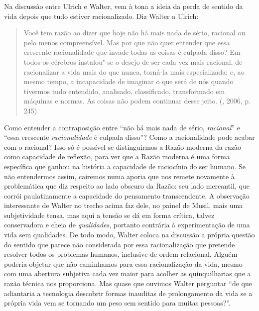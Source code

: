 {Na discussão entre Ulrich e Walter, vem à tona a ideia da perda de
sentido da vida depois que tudo estiver racionalizado. Diz Walter a
Ulrich:

\begin{quote}
Você tem razão ao dizer que hoje não há mais nada de sério, racional ou
pelo menos compreensível. Mas por que não quer entender que essa
crescente racionalidade que invade todas as coisas é culpada disso? Em
todos os cérebros instalou"-se o desejo de ser cada vez mais racional, de
racionalizar a vida mais do que nunca, torná-la mais especializada; e,
ao mesmo tempo, a incapacidade de imaginar o que será de nós quando
tivermos tudo entendido, analisado, classificado, transformado em
máquinas e normas. As coisas não podem continuar desse jeito. (,
2006, p. 245)
\end{quote}

Como entender a contraposição entre ``não há mais nada de sério,
\emph{racional}'' e ``essa crescente \emph{racionalidade} é culpada
disso''? Como a racionalidade pode acabar com o racional? Isso só é
possível se distinguirmos a Razão moderna da razão como capacidade de
reflexão, para ver que a Razão moderna é uma forma específica que ganhou
na história a capacidade de raciocínio do ser humano. Se não entendermos
assim, cairemos numa aporia que nos remete novamente à problemática que
diz respeito ao lado obscuro da Razão: seu lado mercantil, que corrói
paulatinamente a capacidade do pensamento transcendente. A observação
interessante de Walter no trecho acima faz dele, no painel de Musil,
mais uma subjetividade tensa, mas aqui a tensão se dá em forma crítica,
talvez conservadora e cheia de \emph{qualidades}, portanto contrária à
experimentação de uma vida sem qualidades. De todo modo, Walter coloca
na discussão a própria questão do sentido que parece não considerada por
essa racionalização que pretende resolver todos os problemas humanos,
inclusive de ordem relacional. Alguém poderia objetar que não caminhamos
para essa racionalização da vida, mesmo com uma abertura subjetiva cada
vez maior para acolher as quinquilharias que a razão técnica nos
proporciona. Mas quase que ouvimos Walter perguntar ``de que adiantaria
a tecnologia descobrir formas inauditas de prolongamento da vida se a
própria vida vem se tornando um peso sem sentido para muitas pessoas?''.

}
